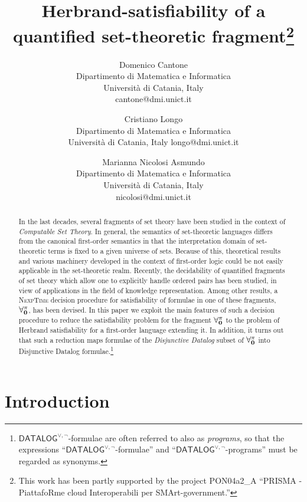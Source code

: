 \documentclass[manyauthors]{fundam}
\title{Herbrand-satisfiability of a quantified set-theoretic 
fragment\thanks{This work has been partly supported by the project
PON04a2\_A ``PRISMA - Piat\-tafoRme cloud Interoperabili per 
SMArt-government.''}}
\author{Domenico Cantone \\
Dipartimento di Matematica e Informatica\\
Universit\`a di  Catania, Italy\\
cantone@dmi.unict.it
\and Cristiano Longo \\
Dipartimento di Matematica e Informatica\\
Universit\`a di  Catania, Italy
longo@dmi.unict.it\\
\and Marianna Nicolosi Asmundo\\
Dipartimento di Matematica e Informatica\\
Universit\`a di  Catania, Italy\\
nicolosi@dmi.unict.it
}
\newcommand{\DisjDatalog}{\ensuremath{\mathsf{DATALOG}^{\vee,\neg}}\xspace}
\begin{document}

\maketitle

\begin{abstract}
In the last decades, several fragments of set theory have been
studied  in the context of \emph{Computable
Set Theory}.
%
In general, the semantics of set-theoretic languages
differs from the canonical first-order semantics in that
the interpretation domain of set-theoretic terms is
fixed to a given universe of sets.
Because of this, theoretical results and various
machinery developed in the context of first-order logic could
be not easily 
applicable 
in the set-theoretic
realm.
%
Recently, the decidability of quantified fragments of set theory
which allow one to explicitly handle ordered pairs has been
studied, 
in view of applications in the 
field of knowledge
representation. Among other results, a \textsc{NexpTime}
decision procedure for satisfiability of formulae
in one of these fragments, $\mathbf{\forall_{0}^{\pi}}$, has been
devised.
%
In this paper we exploit the main features of such a decision
procedure to reduce the satisfiability problem for the fragment
$\mathbf{\forall_{0}^{\pi}}$ to the problem of Herbrand satisfiability for a
first-order language extending it.  In addition, it turns out that
such a reduction maps formulae of the \emph{Disjunctive Datalog} subset
of $\mathbf{\forall_{0}^{\pi}}$ into Disjunctive Datalog formulae.\footnote{$\DisjDatalog$-formulae are often referred to
also as \emph{programs}, so that the expressions
``\DisjDatalog-formulae'' and ``\DisjDatalog-programs'' must be
regarded as synonyms.}
\end{abstract}

\section{Introduction}\label{INTRO}
\end{document}
